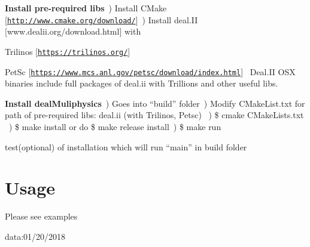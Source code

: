 \begin{DoxyEnumerate}
\item {\bfseries Install pre-\/required libs}~) Install C\+Make \mbox{[}\href{http://www.cmake.org/download/}{\tt http\+://www.\+cmake.\+org/download/}\mbox{]}~) Install deal.\+II \mbox{[}www.\+dealii.\+org/download.html\mbox{]} with~\newline

\begin{DoxyItemize}
\item Trilinos \mbox{[}\href{https://trilinos.org/}{\tt https\+://trilinos.\+org/}\mbox{]}~\newline

\item Pet\+Sc \mbox{[}\href{https://www.mcs.anl.gov/petsc/download/index.html}{\tt https\+://www.\+mcs.\+anl.\+gov/petsc/download/index.\+html}\mbox{]}~\newline
 Deal.\+II O\+SX binaries include full packages of deal.\+ii with Trillions and other useful libs.
\end{DoxyItemize}
\item {\bfseries Install deal\+Muliphysics}~) Goes into “build” folder~) Modify C\+Make\+List.\+txt for path of pre-\/required libs\+: deal.\+ii (with Trilinos, Petsc) ~) \$ cmake C\+Make\+Lists.\+txt ~) \$ make install or do \$ make release install~) \$ make run ~\newline

\begin{DoxyItemize}
\item test(optional) of installation which will run “main” in build folder ~\newline

\end{DoxyItemize}
\end{DoxyEnumerate}

\section*{{\bfseries Usage}~\newline
 }

Please see examples

data\+:01/20/2018 